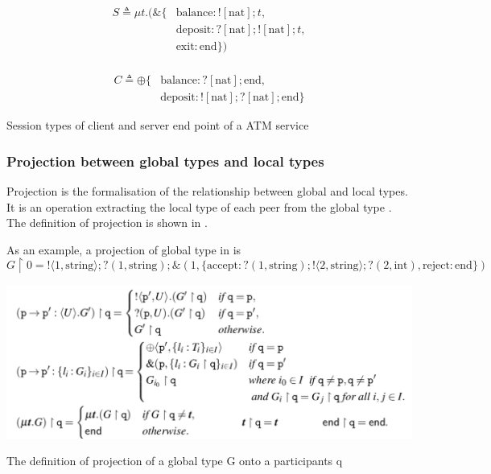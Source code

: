 \begin{table}[ht]
  \begin{minipage}{0.45\textwidth}
    \begin{align*}
      S \triangleq \mu t.(\&\{ & \text{balance}: ![\text{nat}];t, \\
        & \text{deposit}: ?[\text{nat}];![\text{nat}];t, \\
        & \text{exit}: \text{end}\}) \\
    \end{align*}
  \end{minipage}
  \hfill
  \begin{minipage}{0.45\textwidth}
    \begin{align*}
      C \triangleq \oplus \{ &\text{balance}: ?[\text{nat}];\text{end}, \\
                             &\text{deposit}: ![\text{nat}];?[\text{nat}];\text{end} \} 
    \end{align*}
  \end{minipage}
  \caption{Session types of client and server end point of a ATM service}
  \label{b:mpst:ltex}
\end{table}
\subsubsection{Projection between global types and local types} \label{b:mpst:proj}
Projection is the formalisation of the relationship between global and local types. It is an operation extracting the local type of each peer from the global type \cite{coppoGentleIntroductionMultiparty2015}. The definition of projection is shown in .

As an example, a projection of global type in  is
$$
  G \upharpoonright 0 = !\langle 1, \text{string} \rangle;?(1, \text{string});\&(1, \{ \text{accept}: ?(1, \text{string});!\langle 2, \text{string} \rangle;?(2, \text{int}), 
  \text{reject}: \text{end} \})
$$  
\begin{table}[H]
\includegraphics[width=\textwidth]{background/image/proj-def.png}
\caption{The definition of projection of a global type G onto a participants q\cite{coppoGentleIntroductionMultiparty2015}}
\label{b:mpst:pdef}
\end{table}

